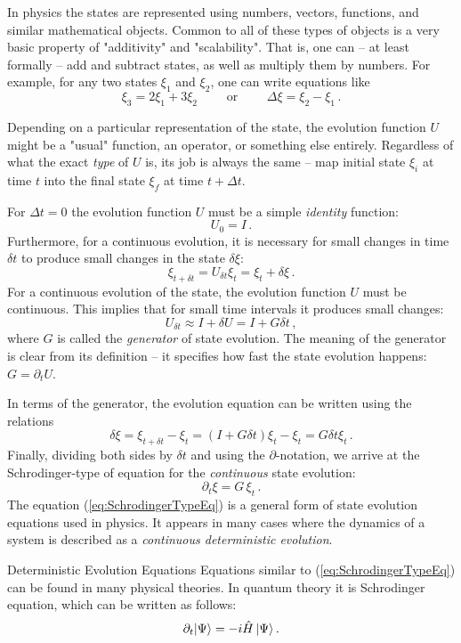 In physics the states are represented using numbers, vectors, functions, and similar mathematical objects. Common to all of these types of objects is a very basic property of "additivity" and "scalability". That is, one can -- at least formally -- add and subtract states, as well as multiply them by numbers. For example, for any two states $\xi_1$ and $\xi_2$, one can write  equations like
\[
\xi_3 = 2\xi_1 + 3\xi_2\qquad\textrm{ or }\qquad \Delta \xi = \xi_2 - \xi_1\,.
\]

Depending on a particular representation of the state, the evolution function $U$ might be a "usual" function, an operator, or something else entirely. Regardless of what the exact \emph{type} of $U$ is, its job is always the same -- map initial state $\xi_i$ at time $t$ into the final state $\xi_f$ at time $t+\Delta t$.
 
For $\Delta t = 0$ the evolution function $U$ must be a simple \emph{identity} function:
\[
U_0 = I\,.
\]
Furthermore, for a continuous evolution, it is necessary for small changes in time $\delta t$ to produce small changes in the state $\delta \xi$:
\[
\xi_{t+\delta t} = U_{\delta t} \xi_t = \xi_t + \delta \xi\,.
\] 
For a continuous evolution of the state, the evolution function $U$ must be continuous. This implies that for small time intervals it produces small changes:
\[
U_{\delta t} \approx I + \delta U = I + G\delta t\,,
\]
where $G$ is called the \emph{generator} of state evolution. The meaning of the generator is clear from its definition -- it specifies how fast the state evolution happens: $G=\partial_t U$.

In terms of the generator, the evolution equation can be written using the relations 
\[
\delta \xi = \xi_{t+\delta t} - \xi_t = \left(I + G\delta t\right)\xi_t - \xi_t = G\delta t\xi_t\,.
\]
Finally, dividing both sides by $\delta t$ and using the $\partial$-notation, we arrive at the Schrodinger-type of equation for the \emph{continuous} state evolution:
\begin{equation}
	\partial_t \xi = G\,\xi_t\,.
	\label{eq:SchrodingerTypeEq}
\end{equation}
The equation (\ref{eq:SchrodingerTypeEq}) is a general form of state evolution equations used in physics. It appears in many cases where the dynamics of a system is described as a \emph{continuous deterministic evolution}. 
\begin{mybio}{Deterministic Evolution Equations}
	Equations similar to (\ref{eq:SchrodingerTypeEq}) can be found in many physical theories. In quantum theory it is Schrodinger equation, which can be written as follows:
	\[
	\partial_t|{\Psi}\rangle = -i\hat{H}\,|{\Psi}\rangle\,.
	\]
\end{mybio}


